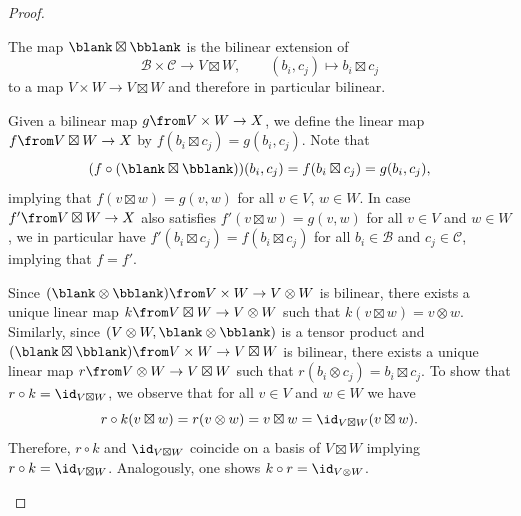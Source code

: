 \documentclass[a4paper,oneside, 12pt]{amsart}
\begin{document}
\begin{proof}
  \begin{thmlist}
    \item The map \( \blank \boxtimes \bblank \) is the bilinear extension of
    \begin{equation*}
      \mathcal{B}\times \mathcal{C} \to V\boxtimes W, \qquad (b_{i}, c_{j})\mapsto b_{i}\boxtimes c_{j}
    \end{equation*}
    to a map \(V \times W \to V \boxtimes W\) and therefore in particular bilinear.
    \item Given a bilinear map \( g \from V \times W \to X \), we define the linear map \( f \from V \boxtimes W \to X \) by \( f(b_i \boxtimes c_j) = g(b_i, c_j) \).
    Note that
    \begin{equation*}
      (f\circ( \blank \boxtimes \bblank)) (b_{i}, c_{j}) =  f(b_{i} \boxtimes c_{j}) = g(b_{i}, c_{j}),
    \end{equation*}
    implying that \(f(v\boxtimes w) = g(v,w)\) for all \(v\in V\), \(w\in W\).
    In case \(f' \from V\boxtimes W \to X \) also satisfies \(f'(v \boxtimes w) = g(v,w)\) for all \(v\in V\) and \(w\in W\), we in particular have \(f'(b_{i}\boxtimes c_{j}) = f(b_{i} \boxtimes c_{j})\) for all \(b_{i}\in \mathcal{B}\) and \(c_{j}\in \mathcal{C}\), implying that \(f = f'\).

    \item Since \( (\blank \otimes \bblank) \from V \times W \to V \otimes W \) is bilinear, there exists a unique linear map \( k \from V \boxtimes W \to V \otimes W \) such that \( k(v \boxtimes w) = v \otimes w\).
    Similarly, since \(( V \otimes W, \blank \otimes \bblank) \) is a tensor product and \( (\blank \boxtimes \bblank) \from V\times W \to V\boxtimes W\) is bilinear, there exists a unique linear map \( r \from V \otimes W \to V \boxtimes W \) such that \( r(b_i \otimes c_j) = b_i \boxtimes c_j \).
    To show that \(r\circ k = \id_{V\boxtimes W}\), we observe that for all \(v\in V\) and \(w\in W\) we have
    \begin{equation*}
      r\circ k (v\boxtimes w) = r(v\otimes w) = v \boxtimes w = \id_{V\boxtimes W} (v\boxtimes w).
    \end{equation*}
    Therefore, \(r\circ k\) and \(\id_{V \boxtimes W}\) coincide on a basis of \(V \boxtimes W\) implying \(r\circ k = \id_{V\boxtimes W}\).
    Analogously, one shows \(k \circ r = \id_{V\otimes W}\). \qedhere
  \end{thmlist}
\end{proof}
\end{document}
